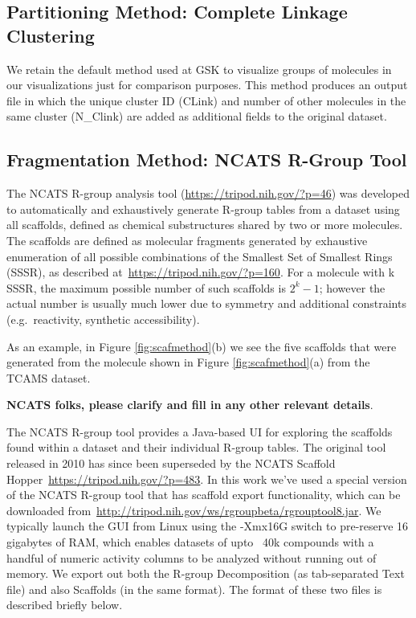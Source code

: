 \documentclass[journal=jacsat,manuscript=article]{achemso}
\newcommand*\fref[1]{Figure \ref{fig:#1}}
\newcommand*\eg{e.g.~}
\begin{document}
\subsection{Partitioning Method: Complete Linkage Clustering}
We retain the default method used at GSK to visualize groups of molecules in our visualizations just for comparison purposes. This method produces an output file in which the unique cluster ID (CLink) and number of other molecules in the same cluster (N\_Clink) are added as additional fields to the original dataset.   

\subsection{Fragmentation Method: NCATS R-Group Tool}
\label{sec:rgtool}
The NCATS R-group analysis tool (\url{https://tripod.nih.gov/?p=46}) was developed to automatically and exhaustively generate R-group tables from a dataset using all scaffolds, defined as chemical substructures shared by two or more molecules. The scaffolds are defined as molecular fragments generated by exhaustive enumeration of all possible combinations of the Smallest Set of Smallest Rings (SSSR), as described at~\url{https://tripod.nih.gov/?p=160}. For a molecule with k SSSR, the maximum possible number of such scaffolds is $2^k - 1$; however the actual number is usually much lower due to symmetry and additional constraints (\eg reactivity, synthetic accessibility).      

As an example, in \fref{scafmethod}(b) we see the five scaffolds that were generated from the molecule shown in \fref{scafmethod}(a) from the TCAMS dataset.

\textbf{NCATS folks, please clarify and fill in any other relevant details}.

The NCATS R-group tool provides a Java-based UI for exploring the scaffolds found within a dataset and their individual R-group tables. The original tool released in 2010 has since been superseded by the NCATS Scaffold Hopper~\url{https://tripod.nih.gov/?p=483}.  In this work we've used a special version of the NCATS R-group tool that has scaffold export functionality, which can be downloaded from~\url{http://tripod.nih.gov/ws/rgroupbeta/rgrouptool8.jar}. We typically launch the GUI from Linux using the -Xmx16G switch to pre-reserve 16 gigabytes of RAM, which enables datasets of upto ~40k compounds with a handful of numeric activity columns to be analyzed without running out of memory. We export out both the R-group Decomposition (as tab-separated Text file) and also Scaffolds (in the same format). The format of these two files is described briefly below.
\end{document}
